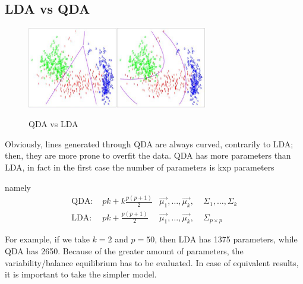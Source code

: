     \subsection{LDA vs QDA}

      \begin{figure}[H]
        \caption{QDA vs LDA}
        \centering
        \includegraphics[width=0.7\textwidth]{QDAvsLDA}
        \label{fig: QDA vs LDA}
        \end{figure}
    


      Obviously, lines generated through QDA are always curved, contrarily to
      LDA; then, they are more prone to overfit the data. QDA has more
      parameters than LDA, in fact in the first case the number of parameters is kxp parameters
      
      
      namely
      \begin{align*}
        \text{QDA: } & pk + k\frac{p(p+1)}{2} 
        &\vec{\mu_1},\dots,\vec{\mu_k},&\;\Sigma_1,\dots,\Sigma_k\\
        \text{LDA: } & pk + \frac{p(p+1)}{2}
        &\vec{\mu_1},\dots,\vec{\mu_k},&\;\Sigma_{p\times p}
      \end{align*}

      For example, if we take $k=2$ and $p=50$, then LDA has 1375 parameters,
      while QDA has 2650. Because of the greater amount of parameters, the variability/balance equilibrium has to be evaluated. In case of equivalent results, it is important to take the simpler model.
